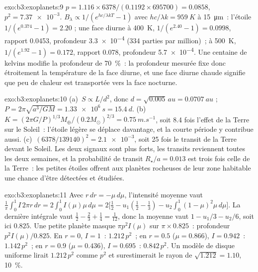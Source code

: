 \begin{solution}{exo:b3:exoplanets:9}
$p = 1.116\times6378/(0.1192\times695700) = 0.0858$, $p^2 = \num{7.37e-3}$.
$B_\lambda \propto 1/(e^{hc/\lambda kT} - 1)$ avec $hc/\lambda k =
\qty{959}{K}$ à \qty{15}{\micro m}~: l'étoile $1/(e^{0.374} - 1) = 2.20$ ;
une face diurne à \qty{400}{K}, $1/(e^{2.40} - 1) = 0.0998$, rapport \num{0.0453},
profondeur \num{3.3e-4} (334 parties par million)~; à \qty{500}{K}, $1/(e^{1.92} -
1) = 0.172$, rapport \num{0.078}, profondeur \num{5.7e-4}. Une centaine de kelvins
modifie la profondeur de \qty{70}{\percent}~: la profondeur mesurée fixe donc
étroitement la température de la face diurne, et une face diurne chaude signifie
que peu de chaleur est transportée vers la face nocturne.
\end{solution}

\begin{solution}{exo:b3:exoplanets:10}
(a)~$S \propto L/d^2$, donc $d = \sqrt{0.005}\,\unit{au} = \qty{0.0707}{au}$ ;
$P = 2\pi\sqrt{a^3/GM} = \qty{1.33e6}{s} = \qty{15.4}{d}$.
(b)~$K = (2\pi G/P)^{1/3}M_\oplus/(0.2M_\odot)^{2/3} = \qty{0.75}{m.s^{-1}}$,
soit 8.4 fois l'effet de la Terre sur le Soleil~: l'étoile légère se déplace davantage,
et la courte période y contribue aussi. (c)~$(6378/139140)^2 = \num{2.1e-3}$, soit 25 fois
le transit de la Terre devant le Soleil. Les deux signaux sont plus forts, les transits
reviennent toutes les deux semaines, et la probabilité de transit $R_\star/a =
\num{0.013}$ est trois fois celle de la Terre~: les petites étoiles offrent aux planètes
rocheuses de leur zone habitable une chance d'être détectées et étudiées.
\end{solution}

\begin{solution}{exo:b3:exoplanets:11}
Avec $r\,dr = -\mu\,d\mu$, l'intensité moyenne vaut $\frac1\pi\int_0^1
I\,2\pi r\,dr = 2\int_0^1 I(\mu)\mu\,d\mu = 2\bigl[\tfrac12 - u_1(\tfrac12 -
\tfrac13) - u_2\int_0^1(1 - \mu)^2\mu\,d\mu\bigr]$. La dernière intégrale vaut
$\tfrac12 - \tfrac23 + \tfrac14 = \tfrac1{12}$, donc la moyenne vaut $1 - u_1/3 -
u_2/6$, soit ici $0.825$. Une petite planète masque $\pi p^2 I(\mu)$ sur $\pi\times
0.825$~: profondeur $p^2 I(\mu)/0.825$. En $r = 0$, $I = 1$~: $1.212\,p^2$~; en
$r = 0.5$ ($\mu = 0.866$), $I = 0.942$~: $1.142\,p^2$~; en $r = 0.9$ ($\mu =
0.436$), $I = 0.695$~: $0.842\,p^2$. Un modèle de disque uniforme lirait
$1.212\,p^2$ comme $p^2$ et surestimerait le rayon de $\sqrt{1.212} = 1.10$,
\qty{10}{\percent}.
\end{solution}

